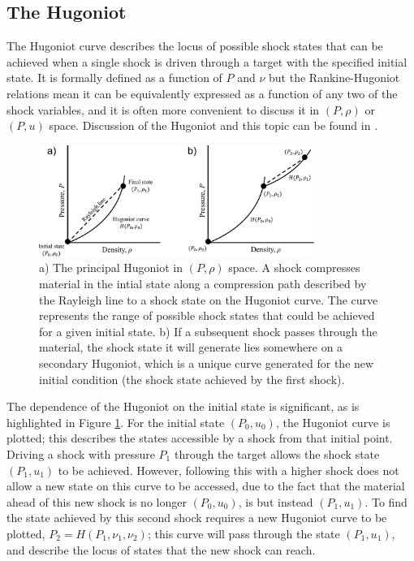\subsection{The Hugoniot}

The Hugoniot curve describes the locus of possible shock states that can be achieved when a single shock is driven through a target with the specified initial state. It is formally defined as a function of $P$ and $\nu$ but the Rankine-Hugoniot relations mean it can be equivalently expressed as a function of any two of the shock variables, and it is often more convenient to discuss it in $(P, \rho)$ or $(P, u)$ space. Discussion of the Hugoniot and this topic can be found in \cite{Forbes2012}.

\begin{figure}
\centering
\includegraphics[width=0.8\textwidth]{figures/Theory/SecondaryHugoniot.pdf}%
\caption{\label{fig:SecondaryHugoniot} a) The principal Hugoniot in $(P, \rho)$ space. A shock compresses material in the intial state along a compression path described by the Rayleigh line to a shock state on the Hugoniot curve. The curve represents the range of possible shock states that could be achieved for a given initial state. b) If a subsequent shock passes through the material, the shock state it will generate lies somewhere on a secondary Hugoniot, which is a unique curve generated for the new initial condition (the shock state achieved by the first shock).}
\end{figure}

The dependence of the Hugoniot on the initial state is significant, as is highlighted in Figure \ref{fig:SecondaryHugoniot}. For the initial state $(P_0, u_0)$, the Hugoniot curve is plotted; this describes the states accessible by a shock from that initial point. Driving a shock with pressure $P_1$ through the target allows the shock state $(P_1, u_1)$ to be achieved. However, following this with a higher shock does not allow a new state on this curve to be accessed, due to the fact that the material ahead of this new shock is no longer $(P_0, u_0)$, is but instead $(P_1, u_1)$. To find the state achieved by this second shock requires a new Hugoniot curve to be plotted, $P_2 = H(P_1, \nu_1, \nu_2)$; this curve will pass through the state $(P_1, u_1)$, and describe the locus of states that the new shock can reach.

